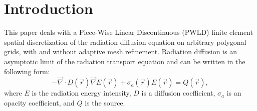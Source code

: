 \documentclass[preprint,10pt]{elsarticle}
\renewcommand{\div}{\vec{\nabla}\! \cdot \!}
\newcommand{\grad}{\vec{\nabla}}
\newcommand{\vr}{\vec{r}}
\newcommand{\tcr}[1]{\textcolor{red}{#1}}
\begin{document}

\linenumbers

\section{Introduction} \label{sec:intro}


This paper deals with a Piece-Wise Linear Discontinuous (PWLD) finite element spatial discretization of 
the radiation diffusion equation on arbitrary polygonal grids, with and without adaptive mesh refinement. 
Radiation diffusion is an asymptotic limit of the radiation transport equation and can be 
written in the following form:
\begin{equation} \label{eq:radiation_diffusion}
- \div  D(\vr) \grad E(\vr) + \sigma_a(\vr) E(\vr) = Q(\vr) ,
\end{equation}
where $E$ is the radiation energy intensity, $D$ is a diffusion coefficient, $\sigma_a$ is 
an opacity coefficient, and $Q$ is the source.
\end{document}
